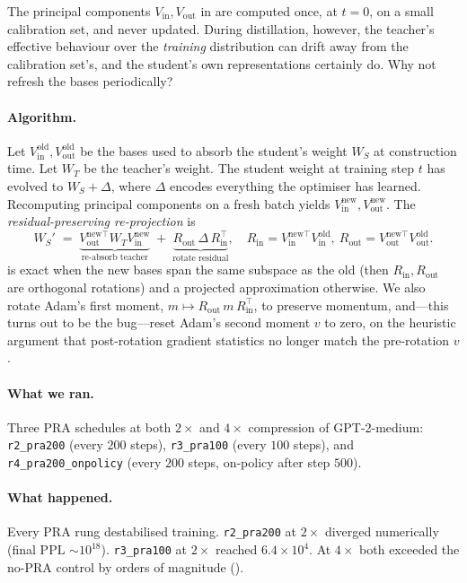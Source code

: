 \documentclass[11pt]{article}
\newcommand{\PPL}{\ensuremath{\mathrm{PPL}}}
\newcommand{\Vin}{V_{\mathrm{in}}}
\newcommand{\Vout}{V_{\mathrm{out}}}
\newcommand{\Wt}{W_T}
\newcommand{\Ws}{W_S}
\newcommand{\pra}{\textsc{PRA}}
\begin{document}
The principal components $\Vin,\Vout$ in  are computed
once, at $t\!=\!0$, on a small calibration set, and never updated. During
distillation, however, the teacher's effective behaviour over the
\emph{training} distribution can drift away from the calibration set's,
and the student's own representations certainly do. Why not refresh the
bases periodically?

\paragraph{Algorithm.}
Let $\Vin^{\mathrm{old}}, \Vout^{\mathrm{old}}$ be the bases used to
absorb the student's weight $\Ws$ at construction time. Let $\Wt$ be the
teacher's weight. The student weight at training step $t$ has evolved to
$\Ws + \Delta$, where $\Delta$ encodes everything the optimiser has
learned. Recomputing principal components on a fresh batch yields
$\Vin^{\mathrm{new}}, \Vout^{\mathrm{new}}$. The
\emph{residual-preserving re-projection} is
\begin{equation}
\label{eq:reabsorb}
\Ws' \;=\; \underbrace{\Vout^{\mathrm{new}\top}\Wt\Vin^{\mathrm{new}}}_{\text{re-absorb teacher}}
       \;+\;
       \underbrace{R_{\mathrm{out}} \, \Delta \, R_{\mathrm{in}}^\top}_{\text{rotate residual}},
\quad
R_{\mathrm{in}}\!=\!\Vin^{\mathrm{new}\top}\Vin^{\mathrm{old}},\
R_{\mathrm{out}}\!=\!\Vout^{\mathrm{new}\top}\Vout^{\mathrm{old}}.
\end{equation}
 is exact when the new bases span the same subspace as
the old (then $R_{\mathrm{in}}, R_{\mathrm{out}}$ are orthogonal
rotations) and a projected approximation otherwise. We also rotate
Adam's first moment, $m \mapsto R_{\mathrm{out}}\,m\,R_{\mathrm{in}}^\top$,
to preserve momentum, and---this turns out to be the bug---reset Adam's
second moment $v$ to zero, on the heuristic argument that post-rotation
gradient statistics no longer match the pre-rotation $v$.

\paragraph{What we ran.}
Three \pra{} schedules at both $2\times$ and $4\times$ compression of
GPT-2-medium: \texttt{r2\_pra200} (every $200$ steps), \texttt{r3\_pra100}
(every $100$ steps), and \texttt{r4\_pra200\_onpolicy} (every $200$
steps, on-policy after step $500$).

\paragraph{What happened.}
Every \pra{} rung destabilised training. \texttt{r2\_pra200} at $2\times$
diverged numerically (final \PPL{} $\sim\!10^{18}$). \texttt{r3\_pra100}
at $2\times$ reached $6.4\!\times\!10^{4}$. At $4\times$ both exceeded
the no-\pra{} control by orders of magnitude (\Cref{tab:v11}).
\end{document}
